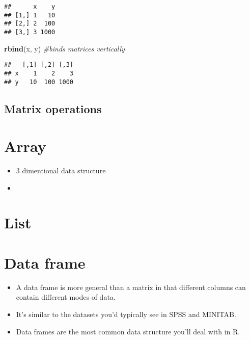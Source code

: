 \documentclass[]{book}
\newenvironment{Shaded}{\begin{snugshade}}{\end{snugshade}}
\newcommand{\CommentTok}[1]{\textcolor[rgb]{0.56,0.35,0.01}{\textit{#1}}}
\newcommand{\KeywordTok}[1]{\textcolor[rgb]{0.13,0.29,0.53}{\textbf{#1}}}
\newcommand{\NormalTok}[1]{#1}
\begin{document}
\begin{verbatim}
##      x    y
## [1,] 1   10
## [2,] 2  100
## [3,] 3 1000
\end{verbatim}

\begin{Shaded}
\begin{Highlighting}[]
\KeywordTok{rbind}\NormalTok{(x, y) }\CommentTok{#binds matrices vertically}
\end{Highlighting}
\end{Shaded}

\begin{verbatim}
##   [,1] [,2] [,3]
## x    1    2    3
## y   10  100 1000
\end{verbatim}

\hypertarget{matrix-operations}{%
\subsection{Matrix operations}\label{matrix-operations}}

\hypertarget{array}{%
\section{Array}\label{array}}

\begin{itemize}
\item
  3 dimentional data structure
\item
\end{itemize}

\hypertarget{list}{%
\section{List}\label{list}}

\hypertarget{data-frame}{%
\section{Data frame}\label{data-frame}}

\begin{itemize}
\item
  A data frame is more general than a matrix in that different columns can contain different modes of data.
\item
  It's similar to the datasets you'd typically see in SPSS and MINITAB.
\item
  Data frames are the most common data structure you'll deal with in R.
\end{itemize}
\end{document}
